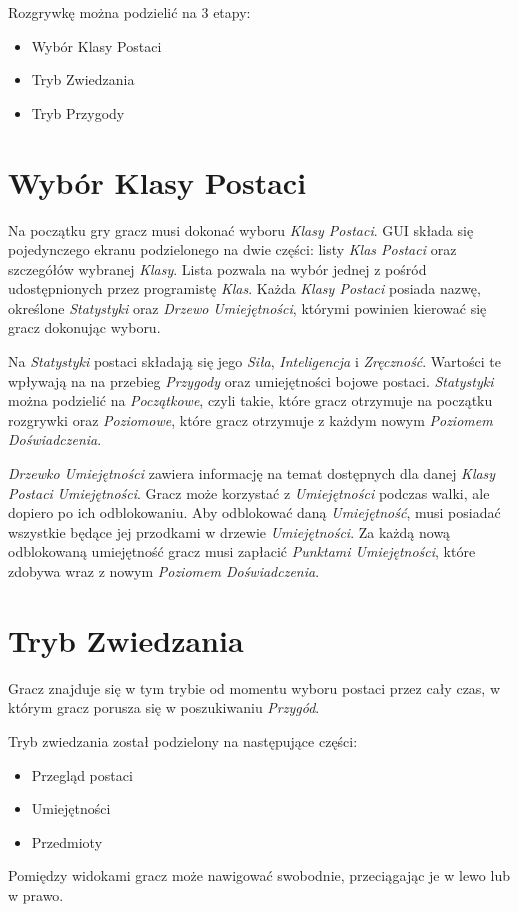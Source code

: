 \documentclass[openright]{xmgr}
\begin{document}
Rozgrywkę można podzielić na 3 etapy:
\begin{itemize}
	\item Wybór Klasy Postaci
	\item Tryb Zwiedzania
	\item Tryb Przygody 
\end{itemize}
\section{Wybór Klasy Postaci}

Na początku gry gracz musi dokonać wyboru \textit{Klasy Postaci}. GUI składa się pojedynczego ekranu podzielonego na dwie części: listy \textit{Klas Postaci} oraz szczegółów wybranej \textit{Klasy}. Lista pozwala na wybór jednej z pośród udostępnionych przez programistę \textit{Klas}. Każda \textit{Klasy Postaci} posiada nazwę, określone \textit{Statystyki} oraz \textit{Drzewo Umiejętności}, którymi powinien kierować się gracz dokonując wyboru.

Na \textit{Statystyki} postaci składają się  jego \textit{Siła}, \textit{Inteligencja} i \textit{Zręczność}. Wartości te wpływają na na przebieg \textit{Przygody} oraz umiejętności bojowe postaci. \textit{Statystyki} można podzielić na \textit{Początkowe}, czyli takie, które gracz otrzymuje na początku rozgrywki oraz \textit{Poziomowe}, które gracz otrzymuje z każdym nowym \textit{Poziomem Doświadczenia}.

\textit{Drzewko Umiejętności} zawiera informację na temat dostępnych dla danej \textit{Klasy Postaci} \textit{Umiejętności}. Gracz może korzystać z \textit{Umiejętności} podczas walki, ale dopiero po ich odblokowaniu. Aby odblokować daną \textit{Umiejętność}, musi posiadać wszystkie będące jej przodkami w drzewie \textit{Umiejętności}. Za każdą nową odblokowaną umiejętność gracz musi zapłacić \textit{Punktami Umiejętności}, które zdobywa wraz z nowym \textit{Poziomem Doświadczenia}.

\section{Tryb Zwiedzania}

Gracz znajduje się w tym trybie od momentu wyboru postaci przez cały czas, w którym gracz porusza się w poszukiwaniu \textit{Przygód}. 

Tryb zwiedzania został podzielony na następujące części: 
\begin{itemize}
	\item Przegląd postaci
	\item Umiejętności
	\item Przedmioty
\end{itemize}
Pomiędzy widokami gracz może nawigować swobodnie, przeciągając je w lewo lub w prawo.
\end{document}
